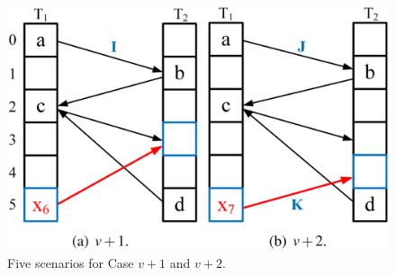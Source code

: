 \documentclass[12pt,conference,compsoc]{IEEEtran}
\begin{document}
\begin{figure}
    \centering
    \includegraphics[width=0.7
    \linewidth]{v+1-2.png}
    \caption{Five scenarios for Case $v+1$ and $v+2$.} \label{fig:v+1-2}
\end{figure}
\end{document}
